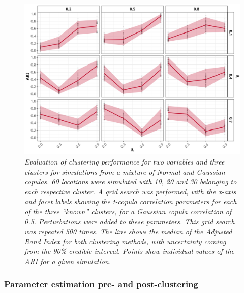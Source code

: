 \documentclass{article}
\numberwithin{equation}{section}
\begin{document}
\begin{figure}[H]
    \centering
    \includegraphics[width = 0.9\linewidth]{plots/sim_01d_js_sens_3_var_dqu_0.9.png}
    \caption{\emph{Evaluation of clustering performance for two variables and three clusters for simulations from a mixture of Normal and Gaussian copulas. 60 locations were simulated with 10, 20 and 30 belonging to each respective cluster. A grid search was performed,  with the x-axis and facet labels showing the t-copula correlation parameters for each of the three ``known'' clusters, for a Gaussian copula correlation of 0.5. Perturbations were added to these parameters. This grid search was repeated 500 times. The line shows the median of the Adjusted Rand Index for both clustering methods, with uncertainty coming from the 90\% credible interval. Points show individual values of the ARI for a given simulation.}} 
    \label{fig:03_realistic}
\end{figure}

\subsubsection{Parameter estimation pre- and post-clustering} \label{subsubsec:sim_refit}

\end{document}
